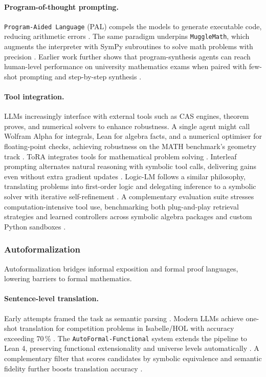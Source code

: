 \documentclass[acmsmall,anonymous]{acmart}
\begin{document}
\paragraph{Program-of-thought prompting.}
\texttt{Program-Aided Language} (PAL) compels the models to generate executable code, reducing arithmetic errors \cite{chen2022program,gao2022pal}.  The same paradigm underpins \texttt{MuggleMath}, which augments the interpreter with SymPy subroutines to solve math problems with precision \cite{li2024mugglemath}.
Earlier work further shows that program-synthesis agents can reach human-level performance on university mathematics exams when paired with few-shot prompting and step-by-step synthesis \cite{drori-2022-program-synthesis}.

\paragraph{Tool integration.}
LLMs increasingly interface with external tools such as CAS engines, theorem proves, and numerical solvers to enhance robustness.  A single agent might call Wolfram Alpha for integrals, Lean for algebra facts, and a numerical optimiser for floating-point checks, achieving robustness on the MATH benchmark’s geometry track \cite{frieder2023mathematical}. ToRA integrates tools for mathematical problem solving \cite{gou2023}.  Interleaf prompting alternates natural reasoning with symbolic tool calls, delivering gains even without extra gradient updates \cite{chen-2023-interleaf}.  Logic-LM follows a similar philosophy, translating problems into first-order logic and delegating inference to a symbolic solver with iterative self-refinement \cite{pan-2023-logiclm}.  A complementary evaluation suite stresses computation-intensive tool use, benchmarking both plug-and-play retrieval strategies and learned controllers across symbolic algebra packages and custom Python sandboxes \cite{zhang-2023-tool-aug}.

\subsubsection{Autoformalization}\label{sec:autoformal}
Autoformalization bridges informal exposition and formal proof languages, lowering barriers to formal mathematics.

\paragraph{Sentence-level translation.}
Early attempts framed the task as semantic parsing \cite{wang2018first}.  Modern LLMs achieve one-shot translation for competition problems in Isabelle/HOL with accuracy exceeding 70\,\% \cite{wu2022autoformalization}.  The \texttt{AutoFormal-Functional} system extends the pipeline to Lean 4, preserving functional extensionality and universe levels automatically \cite{buali2024towards}. A complementary filter that scores candidates by symbolic equivalence and semantic fidelity further boosts translation accuracy \cite{li2024symbolicautoformal}.
\end{document}
